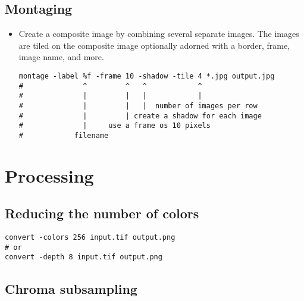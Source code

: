 
\section{Montaging}

\begin{itemize}
\item  Create a composite image by combining several separate images. The
images are tiled on the composite image optionally adorned with a
border, frame, image name, and more.
\begin{lstlisting}
montage -label %f -frame 10 -shadow -tile 4 *.jpg output.jpg
#              ^         ^   ^            ^
#              |         |   |            |
#              |         |   |  number of images per row
#              |         | create a shadow for each image
#              |     use a frame os 10 pixels
#            filename
\end{lstlisting}

\end{itemize}






\chapter{Processing}

\section{Reducing the number of colors}

\begin{lstlisting}
convert -colors 256 input.tif output.png
# or
convert -depth 8 input.tif output.png
\end{lstlisting}


\section{Chroma subsampling}

